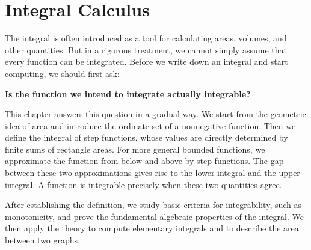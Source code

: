	\chapter{Integral Calculus}

    The integral is often introduced as a tool for calculating areas, volumes, and other quantities. 
    But in a rigorous treatment, we cannot simply assume that every function can be integrated. 
    Before we write down an integral and start computing, we should first ask:

    \begin{center}
        \textbf{Is the function we intend to integrate actually integrable?}
    \end{center}

    This chapter answers this question in a gradual way. We start from the geometric idea of area and introduce the ordinate set of a nonnegative function. 
    Then we define the integral of step functions, whose values are directly determined by finite sums of rectangle areas. 
    For more general bounded functions, we approximate the function from below and above by step functions. 
    The gap between these two approximations gives rise to the lower integral and the upper integral. 
    A function is integrable precisely when these two quantities agree.

    After establishing the definition, we study basic criteria for integrability, such as monotonicity, and prove the fundamental algebraic properties of the integral. 
    We then apply the theory to compute elementary integrals and to describe the area between two graphs.
